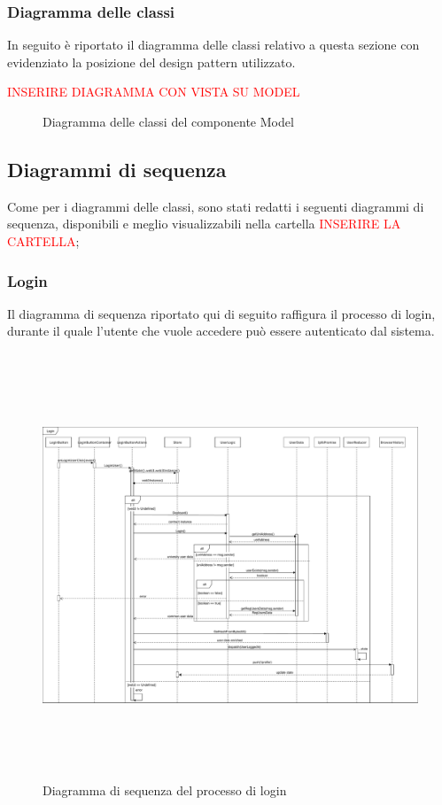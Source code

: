 		\subsubsection{Diagramma delle classi}
		In seguito è riportato il diagramma delle classi relativo a questa sezione con evidenziato la posizione del design pattern utilizzato.
	
	{\textcolor{red}{INSERIRE DIAGRAMMA CON VISTA SU MODEL}}
	\begin{figure}[h]
		\centering
		\caption{Diagramma delle classi del componente Model}
		\label{}
	\end{figure}
		
	
	\subsection{Diagrammi di sequenza}
	Come per i diagrammi delle classi, sono stati redatti i seguenti diagrammi di sequenza, disponibili e meglio visualizzabili nella cartella {\textcolor{red}{INSERIRE LA CARTELLA}};
	
		\subsubsection{Login}
		Il diagramma di sequenza riportato qui di seguito raffigura il processo di login, durante il quale l'utente che vuole accedere può essere autenticato dal sistema.
		
		\begin{figure}[h]
			\centering
				\includegraphics[height=5in]{./Diagrammi/DiagrammaSequenzaLogin.pdf}
			\caption{Diagramma di sequenza del processo di login}
			\label{}
		\end{figure}
		
